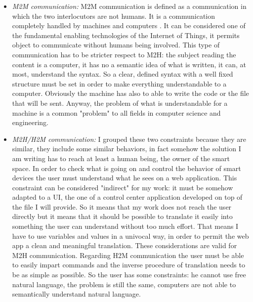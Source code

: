 \begin{itemize}
	\item \textit{M2M communication:} M2M communication is defined as a communication in which the two interlocutors are not humans. It is a communication completely handled by machines and computers \cite{cha2009trust}. It can be considered one of the fundamental enabling technologies of the Internet of Things, it permits object to communicate without humans being involved. This type of communication has to be stricter respect to M2H: the subject reading the content is a computer, it has no a semantic idea of what is written, it can, at most, understand the syntax. So a clear, defined syntax with a well fixed structure  must be set in order to make everything understandable to a computer. Obviously the machine has also to able to write the code or the file that will be sent. Anyway, the problem of what is understandable for a machine is a common "problem" to all fields in computer science and engineering.
	
	\item \textit{M2H/H2M communication:} I grouped these two constraints because they are similar, they include some similar behaviors, in fact somehow the solution I am writing has to reach at least a human being, the owner of the smart space. In order to check what is going on and control the behavior of smart devices the user must understand what he sees on a web application. This constraint can be considered "indirect" for my work: it must be somehow adapted to a UI, the one of a control center application developed on top of the file I will provide. So it means that my work does not reach the user directly but it means that it should be possible to translate it easily into something the user can understand without too much effort. That means I have to use variables and values in a univocal way, in order to permit the web app a clean and meaningful translation. These considerations are valid for M2H communication. Regarding H2M communication the user must be able to easily impart commands and the inverse procedure of translation needs to be as simple as possible. So the user has some constraints: he cannot use free natural language, the problem is still the same, computers are not able to semantically understand natural language. 
	

\end{itemize}
